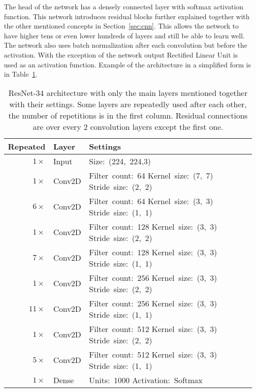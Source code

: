 The head of the network has a densely connected layer with softmax activation function. This network introduces residual blocks further explained together with the other mentioned concepts in Section~\ref{sec:cnn}. This allows the network to have higher tens or even lower hundreds of layers and still be able to learn well. The network also uses batch normalization after each convolution but before the activation. With the exception of the network output Rectified Linear Unit is used as an activation function. Example of the architecture in a simplified form is in Table~\ref{tab:resnet}.

\begin{table}[!ht]
    \centering
    \footnotesize
    \begin{tabular}{ |r|m{5em}|m{9em}|l| }
        \hline
            Repeated & Layer & Settings \\ 
        \hline
        \hline
            $1 \times$ & Input & \mbox{Size: (224, 224,3)}\\
        \hline
            $1 \times$ & Conv2D & \mbox{Filter count: 64} \mbox{Kernel size: (7, 7)} \mbox{Stride size: (2, 2)}\\
        \hline
            $6 \times$ & Conv2D & \mbox{Filter count: 64} \mbox{Kernel size: (3, 3)} \mbox{Stride size: (1, 1)}\\
        \hline
            $1 \times$ & Conv2D & \mbox{Filter count: 128} \mbox{Kernel size: (3, 3)} \mbox{Stride size: (2, 2)}\\
        \hline
            $7 \times$ & Conv2D & \mbox{Filter count: 128} \mbox{Kernel size: (3, 3)} \mbox{Stride size: (1, 1)}\\
        \hline
            $1 \times$ & Conv2D & \mbox{Filter count: 256} \mbox{Kernel size: (3, 3)} \mbox{Stride size: (2, 2)}\\
        \hline
            $11 \times$ & Conv2D & \mbox{Filter count: 256} \mbox{Kernel size: (3, 3)} \mbox{Stride size: (1, 1)}\\
        \hline
            $1 \times$ & Conv2D & \mbox{Filter count: 512} \mbox{Kernel size: (3, 3)} \mbox{Stride size: (2, 2)}\\
        \hline
            $5 \times$ & Conv2D & \mbox{Filter count: 512} \mbox{Kernel size: (3, 3)} \mbox{Stride size: (1, 1)}\\
        \hline
            $1 \times$ & Dense & \mbox{Units: 1000} \mbox{Activation: Softmax} \\
        \hline
        \end{tabular}
    \caption{ResNet-34 architecture with only the main layers mentioned together with their settings. Some layers are repeatedly used after each other, the number of repetitions is in the first column. Residual connections are over every 2 convolution layers except the first one.}
    \label{tab:resnet}
\end{table}

